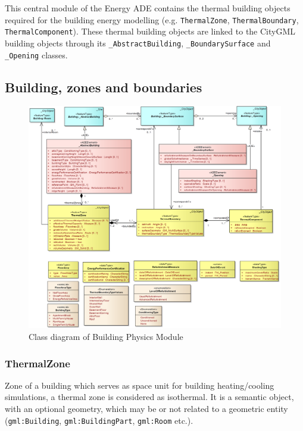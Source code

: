 \documentclass[a4paper,12pt]{article}
\begin{document}
This central module of the Energy ADE contains the thermal building
objects required for the building energy modelling (e.g.
\texttt{ThermalZone}, \texttt{ThermalBoundary},
\texttt{ThermalComponent}). These thermal building objects are linked to
the CityGML building objects through its \texttt{\_AbstractBuilding},
\texttt{\_BoundarySurface} and \texttt{\_Opening} classes.

\subsection{Building, zones and
boundaries}\label{building-zones-and-boundaries}

\begin{figure}[htbp]
\centering
\includegraphics{fig/class_geometry.png}
\caption{Class diagram of Building Physics Module}
\end{figure}

\subsubsection{ThermalZone}\label{thermalzone}

Zone of a building which serves as space unit for building
heating/cooling simulations, a thermal zone is considered as isothermal.
It is a semantic object, with an optional geometry, which may be or not
related to a geometric entity (\texttt{gml:Building},
\texttt{gml:BuildingPart}, \texttt{gml:Room} etc.).
\end{document}
